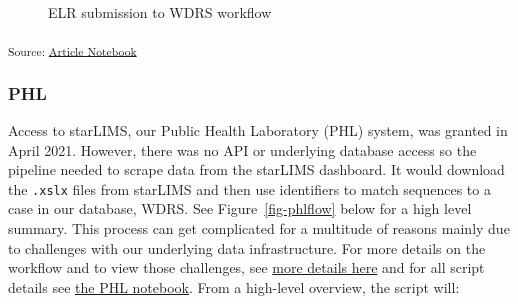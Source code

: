 \documentclass[
  letterpaper,
  DIV=11,
  numbers=noendperiod]{scrartcl}
\begin{document}
\begin{figure}[H]


\caption{\label{fig-elrflow}ELR submission to WDRS workflow}

\end{figure}%

\textsubscript{Source:
\href{https://NW-PaGe.github.io/sequencing_integration_pipeline1.0/index.qmd.html}{Article
Notebook}}

\subsubsection{PHL}\label{sec-phl}

Access to starLIMS, our Public Health Laboratory (PHL) system, was
granted in April 2021. However, there was no API or underlying database
access so the pipeline needed to scrape data from the starLIMS
dashboard. It would download the \texttt{.xslx} files from starLIMS and
then use identifiers to match sequences to a case in our database, WDRS.
See Figure~\ref{fig-phlflow} below for a high level summary. This
process can get complicated for a multitude of reasons mainly due to
challenges with our underlying data infrastructure. For more details on
the workflow and to view those challenges, see
\href{notebooks/phl.Rmd\#fig-phlworkflow}{more details here} and for all
script details see \href{notebooks/phl.Rmd}{the PHL notebook}. From a
high-level overview, the script will:
\end{document}
